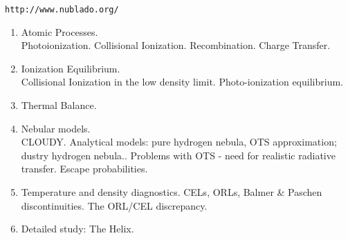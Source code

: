 
\renewcommand\labelitemi{\textcolor{blue}{$\bullet$}}  
\renewcommand\normalcolor{\color{blue}}  %
\renewcommand\Black{\color{black}}        %
\renewcommand\labelitemii{\textcolor{DarkGreen}{$\star$}}  
\color{black}                             %


\LogoOff
\bgclear

\vspace{-1cm}
\begin{center}
{\tt http://www.nublado.org/ }
\end{center}
\vspace{-1cm}
\begin{enumerate}
\item Atomic Processes.\\ 
Photoionization. Collisional Ionization. Recombination. Charge
Transfer. \label{item:processes}
\item Ionization Equilibrium. \\ 
Collisional Ionization in the low density limit. Photo-ionization
equilibrium.    \label{item:equi}
\item Thermal Balance.  \label{item:balance}
\item Nebular models. \\ CLOUDY. Analytical models:
pure hydrogen nebula, OTS approximation; dustry hydrogen nebula..
Problems with OTS - need for realistic radiative transfer. Escape
probabilities.  \label{item:models}
\item Temperature and density diagnostics. CELs, ORLs,
 Balmer \& Paschen discontinuities. The ORL/CEL discrepancy. \label{item:diag}
\item Detailed study: The Helix. \label{item:example}
\end{enumerate} 



\renewcommand\labelitemi{\textcolor{blue}{$\bullet$}}  
\renewcommand\normalcolor{\color{blue}}  %


\renewcommand\labelitemi{\textcolor{blue}{$\bullet$}}  
\renewcommand\Black{\color{black}}        %
\renewcommand\labelitemii{\textcolor{DarkGreen}{$\star$}}  
\color{black}                             %

